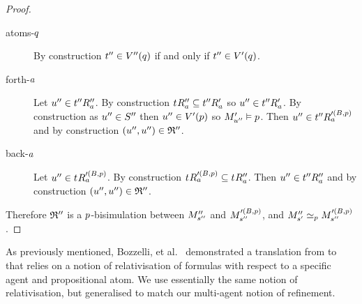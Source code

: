 \begin{proof}
\begin{description}
    \item[atoms-$\atomQ$] 
        By construction $\kStateTPP \in \kValuationPP(\atomQ)$ if and only if $\kStateTPP \in \kValuationP(\atomQ)$.
    \item[forth-$\agentA$]
        Let $\kStateUPP \in \kSuccessorsPPA{\kStateTPP}$.
        By construction $\kSuccessorsPPA{\kStateT} \subseteq \kSuccessorsPA{\kStateTPP}$ so $\kStateUPP \in \kSuccessorsPA{\kStateTPP}$.
        By construction as $\kStateUPP \in \kStatesPP$ then $\kStateUPP \in \kValuationP(\atomP)$ so $\kPModelP{\kStateUPP} \entails \atomP$.
        Then $\kStateUPP \in \kSuccessorsA[\prime(\agentsB, \atomP)]{\kStateTPP}$ and by construction $(\kStateUPP, \kStateUPP) \in \bisimulation''$.
    \item[back-$\agentA$]
        Let $\kStateUPP \in \kSuccessorsA[\prime(\agentsB, \atomP)]{\kStateT}$.
        By construction $\kSuccessorsA[\prime(\agentsB, \atomP)]{\kStateT} \subseteq \kSuccessorsPPA{\kStateT}$.
        Then $\kStateUPP \in \kSuccessorsPPA{\kStateTPP}$ and by construction $(\kStateUPP, \kStateUPP) \in \bisimulation''$.
\end{description}

Therefore $\bisimulation''$ is a $\atomP$-bisimulation between $\kPModelPP{\kStateSPP}$ and $\kPModel[\prime(\agentsB, \atomP)]{\kStateSPP}$, and $\kPModelPP{\kStateSP} \bisimilar[\atomP] \kPModel[\prime(\agentsB, \atomP)]{\kStateSPP}$.
\end{proof}

As previously mentioned, Bozzelli, et al.~\cite{bozzelli:2014b} demonstrated a translation from \langRml{} to \langBqml{} that relies on a notion of relativisation of \langBqml{} formulas with respect to a specific agent and propositional atom.
We use essentially the same notion of relativisation, but generalised to match our multi-agent notion of refinement.


